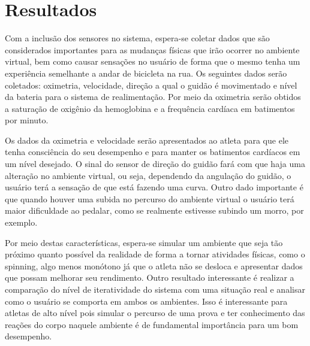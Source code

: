 \chapter[Resultados]{Resultados}

Com a inclusão dos sensores no sistema, espera-se coletar dados que são considerados importantes para as mudanças físicas que irão ocorrer no ambiente virtual, bem como causar sensações no usuário de forma que o mesmo tenha um experiência semelhante a andar de bicicleta na rua. Os seguintes dados serão coletados: oximetria, velocidade, direção a qual o guidão é movimentado e nível da bateria para o sistema de realimentação. Por meio da oximetria serão obtidos a saturação de oxigênio da hemoglobina e a frequência cardíaca em batimentos por minuto.

Os dados da oximetria e velocidade serão apresentados ao atleta para que ele tenha consciência do seu desempenho e para manter os batimentos cardíacos em um nível desejado. O sinal do sensor de direção do guidão fará com que haja uma alteração no ambiente virtual, ou seja, dependendo da angulação do guidão, o usuário terá a sensação de que está fazendo uma curva. Outro dado importante é que quando houver uma subida no percurso do ambiente virtual o usuário terá maior dificuldade ao pedalar, como se realmente estivesse subindo um morro, por exemplo.

Por meio destas características, espera-se simular um ambiente que seja tão próximo quanto possível da realidade de forma a tornar atividades físicas, como o spinning, algo menos monótono já que o atleta não se desloca e apresentar dados que possam melhorar seu rendimento. Outro resultado interessante é realizar a comparação do nível de iteratividade do sistema com uma situação real e analisar como o usuário se comporta em ambos os ambientes. Isso é interessante para atletas de alto nível pois simular o percurso de uma prova e ter conhecimento das reações do corpo naquele ambiente é de fundamental importância para um bom desempenho.

